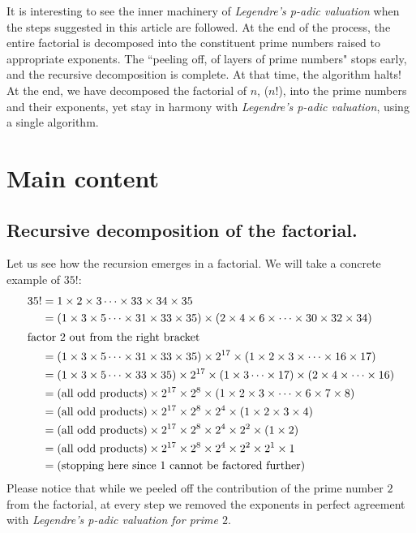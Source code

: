 \documentclass[10 pt,a4paper, article]{amsart}
\begin{document}
It is interesting to see the inner machinery of \emph{Legendre's p-adic valuation} when the steps suggested in this article are followed. At the end of the process, the entire factorial is decomposed into the constituent prime numbers raised to appropriate exponents. The ``peeling off, of layers of prime numbers" stops early, and the recursive decomposition is complete. At that time, the algorithm halts! At the end, we have decomposed the factorial of $n$, ($n!$), into the prime numbers and their exponents, yet stay in harmony with \emph{Legendre's p-adic valuation}, using a single algorithm.

\section{Main content}\label{sec:maincontent}

\subsection{Recursive decomposition of the factorial.}
Let us see how the recursion emerges in a factorial. We will take a concrete example of $35!$:
\begin{align*}
35! &= 1 \times 2 \times 3 \cdots \times 33 \times 34 \times 35 \\
    &= (1 \times 3 \times 5 \cdots \times 31 \times 33 \times 35) \times (2 \times 4 \times 6 \times \cdots \times 30 \times 32 \times 34) \\
    \intertext{factor 2 out from the right bracket}
    &= (1 \times 3 \times 5 \cdots \times 31 \times 33 \times 35) \times 2^{17} \times (1 \times 2 \times 3 \times \cdots \times 16 \times 17) \\
    &= (1 \times 3 \times 5 \cdots \times 33 \times 35) \times 2^{17} \times (1 \times 3 \cdots \times 17) \times (2 \times 4 \times \cdots \times 16) \\
    &= (\text{all odd products}) \times 2^{17} \times 2^8 \times (1 \times 2 \times 3 \times \cdots \times 6 \times 7 \times 8) \\
    &= (\text{all odd products}) \times 2^{17} \times 2^8 \times 2^4 \times (1 \times 2 \times 3 \times 4) \\
    &= (\text{all odd products}) \times 2^{17} \times 2^8 \times 2^4 \times 2^2 \times (1 \times 2) \\
    &= (\text{all odd products}) \times 2^{17} \times 2^8 \times 2^4 \times 2^2 \times 2^1 \times 1 \\
    &= \text{(stopping here since $1$ cannot be factored further)}
\end{align*}
Please notice that while we peeled off the contribution of the prime number $2$ from the factorial, at every step we removed the exponents in perfect agreement with \emph{Legendre's p-adic valuation for prime $2$}.
\end{document}
